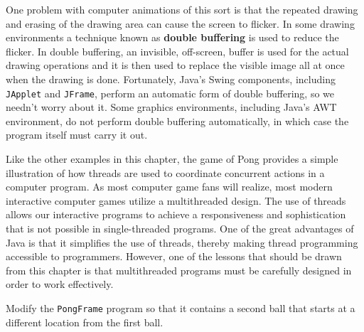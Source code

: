 One problem with computer animations of this sort is that the repeated
drawing and erasing of the drawing area can cause the screen to
flicker. In some drawing environments a technique known as {\bf double
buffering} is used to reduce the flicker. In double buffering, an
invisible, off-screen, buffer is used for the actual drawing
operations and it is then used to replace the visible image all at
once when the drawing is done.  Fortunately, Java's Swing components,
including {\tt JApplet} and {\tt JFrame}, perform an automatic form of
double buffering, so we needn't worry about it.  Some graphics
environments, including Java's AWT environment, do not perform double
buffering automatically, in which case the program itself must carry
it out.

Like the other examples in this chapter, the game of Pong provides a
simple illustration of how threads are used to coordinate concurrent
actions in a computer program. As most computer game fans will
realize, most modern interactive computer games utilize a
multithreaded design. The use of threads allows our interactive
programs to achieve a responsiveness and sophistication that is not
possible in single-threaded programs.  One of the great advantages of
Java is that it simplifies the use of threads, thereby making thread
programming accessible to programmers.  However, one of the lessons
that should be drawn from this chapter is that multithreaded programs
must be carefully designed in order to work effectively.

\begin{SSTUDY}

\item Modify the {\tt PongFrame} program so that it contains a second
ball that starts at a different location from the first ball.

\end{SSTUDY}





